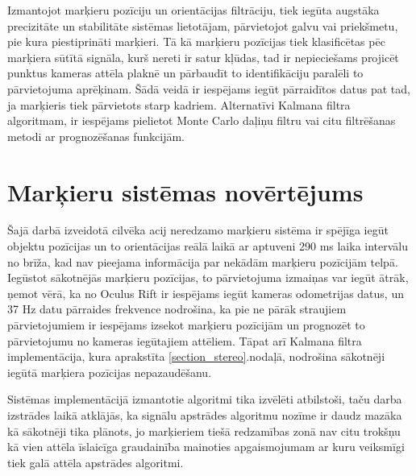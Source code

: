 \documentclass[12pt, a4paper, oneside, openright]{article}
\begin{document}
\par 
Izmantojot marķieru pozīciju un orientācijas filtrāciju, tiek iegūta augstāka precizitāte un
stabilitāte sistēmas lietotājam, pārvietojot galvu vai priekšmetu, pie kura piestiprināti marķieri.
Tā kā marķieru pozīcijas tiek klasificētas pēc marķiera sūtītā signāla, kurš nereti ir satur kļūdas,
tad ir nepieciešams projicēt punktus kameras attēla plaknē un pārbaudīt to identifikāciju paralēli 
to pārvietojuma aprēķinam. Šādā veidā ir iespējams iegūt pārraidītos datus pat tad, ja marķieris tiek pārvietots
starp kadriem. Alternatīvi Kalmana filtra algoritmam, ir iespējams pielietot Monte Carlo daļiņu filtru
vai citu filtrēšanas metodi ar prognozēšanas funkcijām.


\newpage
\section{Marķieru sistēmas novērtējums}

\par
Šajā darbā izveidotā cilvēka acij neredzamo marķieru sistēma ir spējīga iegūt objektu pozīcijas un
to orientācijas reālā laikā ar aptuveni 290 ms laika intervālu no brīža, kad nav pieejama informācija
par nekādām marķieru pozīcijām telpā. 
Iegūstot sākotnējās marķieru pozīcijas, to pārvietojuma izmaiņas
var iegūt ātrāk, ņemot vērā, ka no Oculus Rift ir iespējams iegūt kameras odometrijas datus, un 37 Hz
datu pārraides frekvence nodrošina, ka pie ne pārāk straujiem pārvietojumiem ir iespējams izsekot marķieru
pozīcijām un prognozēt to pārvietojumu no kameras iegūtajiem attēliem. Tāpat arī Kalmana filtra implementācija,
kura aprakstīta \ref{section_stereo}.nodaļā, nodrošina sākotnēji iegūtā marķiera pozīcijas nepazaudēšanu.

\par
Sistēmas implementācijā izmantotie algoritmi tika izvēlēti atbilstoši, taču darba izstrādes laikā
atklājās, ka signālu apstrādes algoritmu nozīme ir daudz mazāka kā sākotnēji tika plānots, jo
marķieriem tiešā redzamības zonā nav citu trokšņu kā vien attēla īslaicīga graudainība mainoties apgaismojumam
ar kuru veiksmīgi tiek galā attēla apstrādes algoritmi.
\end{document}

